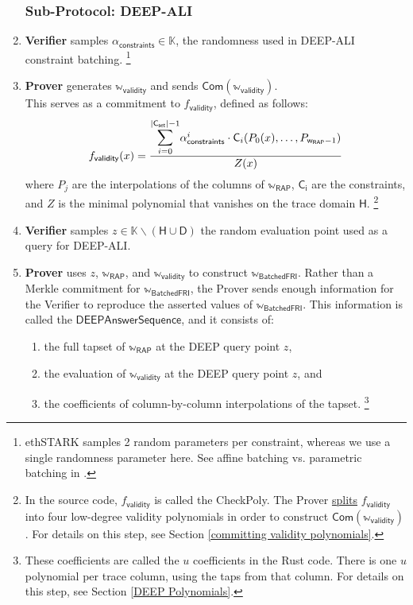 \documentclass[10pt,letterpaper,titlepage]{article}
\theoremstyle{definition}
\begin{document}
\begin{enumerate}
  \subsubsection{Sub-Protocol: DEEP-ALI}
  \item \textbf{Verifier} samples $\alpha_\mathsf{constraints}\in\mathbb{K}$, the randomness used in DEEP-ALI constraint batching.%
  \footnote{ethSTARK samples 2 random parameters per constraint, whereas we use a single randomness parameter here. See affine batching vs. parametric batching in \cite{FRIsummary}.}
  \item \textbf{Prover} generates $\mathbb{w}_\mathsf{validity}$ and sends $\mathsf{Com}(\mathbb{w}_\mathsf{validity})$. \\
  This serves as a commitment to $f_\mathsf{validity}$, defined as follows:
  \[
    f_\mathsf{validity}(x)=
    \frac{
      \mathlarger{
        \mathlarger{\sum}}_{i=0}^{
          \mathsf{|\mathsf{C_{set}|}}-1
          }
          \alpha_\mathsf{constraints}^i\cdot \mathsf{C}_i(P_0(x),\ldots,P_{\mathsf{w_{RAP}}-1})}
      {Z(x)}
  \]
  where $P_j$ are the interpolations of the columns of $\mathbb{w}_\mathsf{RAP}$, $\mathsf{C_i}$ are the constraints, and $Z$ is the minimal polynomial that vanishes on the trace domain $\mathsf{H}$.%
  \footnote{
    In the source code, $f_\mathsf{validity}$ is called the CheckPoly. The Prover \hyperref[split]{splits} $f_\mathsf{validity}$ into four low-degree validity polynomials in order to construct $\mathsf{Com}(\mathbb{w}_\mathsf{validity})$.
    For details on this step, see Section \ref{committing validity polynomials}.
    }
  \item \textbf{Verifier} samples $z\in\mathbb{K}\backslash(\mathsf{H}\cup\mathsf{D})$ the random evaluation point used as a query for DEEP-ALI.
  \item \textbf{Prover} uses $z$, $\mathbb{w}_\mathsf{RAP}$, and $\mathbb{w}_\mathsf{validity}$ to construct $\mathbb{w}_\mathsf{BatchedFRI}$.
  Rather than a Merkle commitment for $\mathbb{w}_\mathsf{BatchedFRI}$, the Prover sends enough information for the Verifier to reproduce the asserted values of $\mathbb{w}_\mathsf{BatchedFRI}$.
  This information is called the $\mathsf{DEEPAnswerSequence}$, and it consists of:
  \begin{enumerate}
    \item the full tapset of $\mathbb{w}_\mathsf{RAP}$ at the DEEP query point $z$,
    \item the evaluation of $\mathbb{w}_\mathsf{validity}$ at the DEEP query point $z$, and
    \item the coefficients of column-by-column interpolations of the tapset.%
    \footnote{
      These coefficients are called the $u$ coefficients in the Rust code.
      There is one $u$ polynomial per trace column, using the taps from that column.
      For details on this step, see Section \ref{DEEP Polynomials}.
      }
  \end{enumerate}

\end{enumerate}
\end{document}
